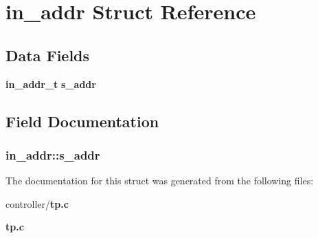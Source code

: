 \section{in\_\-addr Struct Reference}
\label{structin__addr}
\subsection*{Data Fields}
\begin{DoxyCompactItemize}
\item 
{\bf in\_\-addr\_\-t} {\bf s\_\-addr}
\end{DoxyCompactItemize}


\subsection{Field Documentation}
\subsubsection[{s\_\-addr}]{ {\bf in\_\-addr::s\_\-addr}}\label{structin__addr_a3b6ef12385f913cc23a199205d9bf858}


The documentation for this struct was generated from the following files:\begin{DoxyCompactItemize}
\item 
controller/{\bf tp.c}\item 
{\bf tp.c}\end{DoxyCompactItemize}
